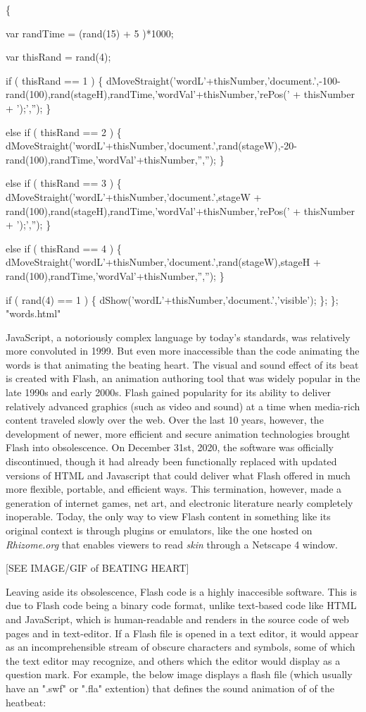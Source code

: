 \documentclass[11pt]{article}
\begin{document}
\begin{enumerate}
\begin{SOURCE}
\{

var randTime = (rand(15) + 5 )*1000;

var thisRand = rand(4);

if ( thisRand == 1 ) \{ 
dMoveStraight('wordL'+thisNumber,'document.',-100-rand(100),rand(stageH),randTime,'wordVal'+thisNumber,'rePos(' +
thisNumber + ');',''); \}

else if ( thisRand == 2 ) \{
dMoveStraight('wordL'+thisNumber,'document.',rand(stageW),-20-rand(100),randTime,'wordVal'+thisNumber,'',''); \}

else if ( thisRand == 3 ) \{
dMoveStraight('wordL'+thisNumber,'document.',stageW + rand(100),rand(stageH),randTime,'wordVal'+thisNumber,'rePos(' + thisNumber + ');',''); \}

else if ( thisRand == 4 ) \{
dMoveStraight('wordL'+thisNumber,'document.',rand(stageW),stageH + rand(100),randTime,'wordVal'+thisNumber,'',''); \}

if ( rand(4) == 1 ) \{ dShow('wordL'+thisNumber,'document.','visible'); \};
\}; "words.html"
\end{SOURCE}
JavaScript, a notoriously complex language by today's standards, was
relatively more convoluted in 1999. But even more inaccessible than
the code animating the words is that animating the beating heart. The
visual and sound effect of its beat is created with Flash, an
animation authoring tool that was widely popular in the late 1990s and
early 2000s. Flash gained popularity for its ability to deliver
relatively advanced graphics (such as video and sound) at a time when
media-rich content traveled slowly over the web. Over the last 10
years, however, the development of newer, more efficient and secure
animation technologies brought Flash into obsolescence. On December
31st, 2020, the software was officially discontinued, though it had
already been functionally replaced with updated versions of HTML and
Javascript that could deliver what Flash offered in much more
flexible, portable, and efficient ways. This termination, however,
made a generation of internet games, net art, and electronic
literature nearly completely inoperable. Today, the only way to view
Flash content in something like its original context is through
plugins or emulators, like the one hosted on \emph{Rhizome.org} that
enables viewers to read \emph{skin} through a Netscape 4 window.

[SEE IMAGE/GIF of BEATING HEART] 

Leaving aside its obsolescence, Flash code is a highly inaccesible
software. This is due to Flash code being a binary code format, unlike
text-based code like HTML and JavaScript, which is human-readable and
renders in the source code of web pages and in text-editor. If a Flash
file is opened in a text editor, it would appear as an
incomprehensible stream of obscure characters and symbols, some of
which the text editor may recognize, and others which the editor would
display as a question mark. For example, the below image displays a
flash file (which usually have an ".swf" or ".fla" extention) that
defines the sound animation of of the heatbeat:


\end{enumerate}
\end{document}

